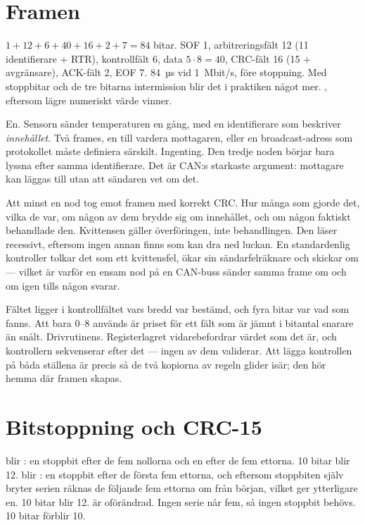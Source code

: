 \section{Framen}

 $1 + 12 + 6 + 40 + 16 + 2 + 7 = 84$ bitar. SOF 1, arbitreringsfält 12 (11 identifierare +
RTR), kontrollfält 6, data $5 \cdot 8 = 40$, CRC-fält 16 (15 + avgränsare), ACK-fält 2, EOF 7.
 84~µs vid 1~Mbit/s, före stoppning. Med stoppbitar och de tre bitarna intermission blir
det i praktiken något mer.
 , eftersom lägre numeriskt värde vinner.

 En. Sensorn sänder temperaturen en gång, med en identifierare som beskriver
\emph{innehållet}.
 Två frames, en till vardera mottagaren, eller en broadcast-adress som protokollet måste
definiera särskilt.
 Ingenting. Den tredje noden börjar bara lyssna efter samma identifierare. Det är CAN:s
starkaste argument: mottagare kan läggas till utan att sändaren vet om det.

 Att minst en nod tog emot framen med korrekt CRC.
 Hur många som gjorde det, vilka de var, om någon av dem brydde sig om innehållet, och om
någon faktiskt behandlade den. Kvittensen gäller överföringen, inte behandlingen.
 Den läser recessivt, eftersom ingen annan finns som kan dra ned luckan. En standardenlig
kontroller tolkar det som ett kvittensfel, ökar sin sändarfelräknare och skickar om --- vilket är
varför en ensam nod på en CAN-buss sänder samma frame om och om igen tills någon svarar.

 Fältet ligger i kontrollfältet vars bredd var bestämd, och fyra bitar var vad som fanns.
Att bara 0--8 används är priset för ett fält som är jämnt i bitantal snarare än snålt.
 Drivrutinens. Registerlagret vidarebefordrar värdet som det är, och kontrollern
sekvenserar efter det --- ingen av dem validerar. Att lägga kontrollen på båda ställena är precis
så de två kopiorna av regeln glider isär; den hör hemma där framen skapas.

\section{Bitstoppning och CRC-15}

  blir : en stoppbit efter de fem nollorna och en efter
de fem ettorna. 10 bitar blir 12.
  blir : en stoppbit efter de första fem ettorna, och
eftersom stoppbiten själv bryter serien räknas de följande fem ettorna om från början, vilket ger
ytterligare en. 10 bitar blir 12.
  är oförändrad. Ingen serie når fem, så ingen stoppbit behövs. 10 bitar
förblir 10.

